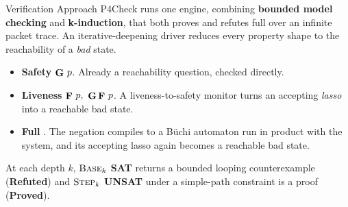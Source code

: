 \begin{frame}{Verification Approach}
  P4Check runs one engine, combining \textbf{bounded model checking} and
  \textbf{k-induction}, that both proves and refutes full \LTL{} over an infinite
  packet trace. An iterative-deepening driver reduces every property shape to the
  reachability of a \emph{bad} state.

  \vspace{0.9em}
  \begin{itemize}\setlength\itemsep{0.9em}
    \item \textbf{Safety} \(\mathop{\mathbf{G}}\, p\). Already a reachability question,
          checked directly.
    \item \textbf{Liveness} \(\mathop{\mathbf{F}}\, p,\ \mathop{\mathbf{G}}\mathop{\mathbf{F}}\, p\). A
          liveness-to-safety monitor turns an accepting \emph{lasso} into a
          reachable bad state.
    \item \textbf{Full \LTL{}}. The negation compiles to a B\"uchi automaton run
          in product with the system, and its accepting lasso again becomes a
          reachable bad state.
  \end{itemize}

  \vspace{0.9em}
  At each depth \(k\), \(\textsc{Base}_k\)
  \textcolor{palCoral!75!black}{\textbf{SAT}} returns a bounded looping
  counterexample (\textbf{Refuted}) and \(\textsc{Step}_k\)
  \textcolor{palOlivine!60!black}{\textbf{UNSAT}} under a simple-path constraint
  is a proof (\textbf{Proved}).
\end{frame}

